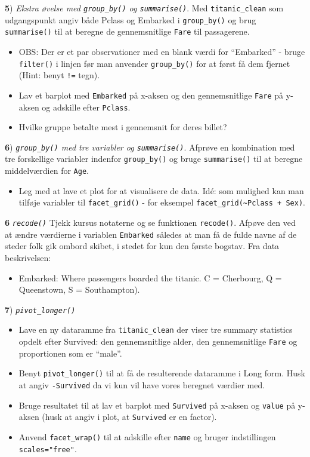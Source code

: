 \documentclass[
]{book}
\providecommand{\tightlist}{%
  \setlength{\itemsep}{0pt}\setlength{\parskip}{0pt}}
\begin{document}
\textbf{5}) \emph{Ekstra øvelse med \texttt{group\_by()} og \texttt{summarise()}}. Med \texttt{titanic\_clean} som udgangspunkt angiv både Pclass og Embarked i \texttt{group\_by()} og brug \texttt{summarise()} til at beregne de gennemsnitlige \texttt{Fare} til passagerene.

\begin{itemize}
\tightlist
\item
  OBS: Der er et par observationer med en blank værdi for ``Embarked'' - bruge \texttt{filter()} i linjen før man anvender \texttt{group\_by()} for at først få dem fjernet (Hint: benyt \texttt{!=} tegn).
\item
  Lav et barplot med \texttt{Embarked} på x-aksen og den gennemsnitlige \texttt{Fare} på y-aksen og adskille efter \texttt{Pclass}.
\item
  Hvilke gruppe betalte mest i gennemsnit for deres billet?
\end{itemize}

\textbf{6}) \emph{\texttt{group\_by()} med tre variabler og \texttt{summarise()}}. Afprøve en kombination med tre forskellige variabler indenfor \texttt{group\_by()} og bruge \texttt{summarise()} til at beregne middelværdien for \texttt{Age}.

\begin{itemize}
\tightlist
\item
  Leg med at lave et plot for at visualisere de data. Idé: som mulighed kan man tilføje variabler til \texttt{facet\_grid()} - for eksempel \texttt{facet\_grid(\textasciitilde{}Pclass\ +\ Sex)}.
\end{itemize}

\textbf{6} \emph{\texttt{recode()}} Tjekk kursus notaterne og se funktionen \texttt{recode()}. Afpøve den ved at ændre værdierne i variablen \texttt{Embarked} således at man få de fulde navne af de steder folk gik ombord skibet, i stedet for kun den første bogstav. Fra data beskrivelsen:

\begin{itemize}
\tightlist
\item
  Embarked: Where passengers boarded the titanic. C = Cherbourg, Q = Queenstown, S = Southampton).
\end{itemize}

\textbf{7}) \emph{\texttt{pivot\_longer()}}

\begin{itemize}
\item
  Lave en ny dataramme fra \texttt{titanic\_clean} der viser tre summary statistics opdelt efter Survived: den gennemsnitlige alder, den gennemsnitlige \texttt{Fare} og proportionen som er ``male''.
\item
  Benyt \texttt{pivot\_longer()} til at få de resulterende dataramme i Long form. Husk at angiv \texttt{-Survived} da vi kun vil have vores beregnet værdier med.
\item
  Bruge resultatet til at lav et barplot med \texttt{Survived} på x-aksen og \texttt{value} på y-aksen (husk at angiv i plot, at \texttt{Survived} er en factor).
\item
  Anvend \texttt{facet\_wrap()} til at adskille efter \texttt{name} og bruger indstillingen \texttt{scales="free"}.
\end{itemize}
\end{document}
